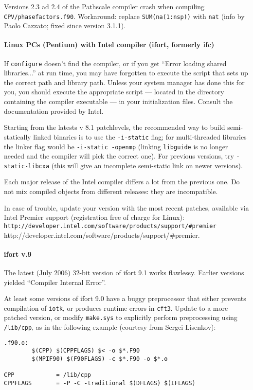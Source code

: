 \documentclass[12pt,a4paper]{article}
\begin{document}
Versions 2.3 ad 2.4 of the Pathscale compiler crash when compiling
\texttt{CPV/phasefactors.f90}. Workaround: replace \texttt{SUM(na(1:nsp))}
with \texttt{nat} (info by Paolo Cazzato; fixed since version 3.1.1).

\paragraph{Linux PCs (Pentium) with Intel compiler (ifort, formerly
ifc)}

\hfill\break
If \texttt{configure} doesn't find the compiler, or if you get ``Error
loading shared libraries...'' at run time, you may have forgotten to
execute the script that sets up the correct path and library path.
Unless your system manager has done this for you, you should execute
the appropriate script --- located in the directory containing the
compiler executable --- in your initialization files.
Consult the documentation provided by Intel. 

Starting from the latests v 8.1 patchlevels, the recommended way to
build semi-statically linked binaries is to use the \texttt{-i-static}
flag; for multi-threaded libraries the linker flag would be
\texttt{-i-static -openmp} (linking \texttt{libguide} is no longer 
needed and the compiler will pick the correct one). For previous 
versions, try \texttt{-static-libcxa} (this will
give an incomplete semi-static link on newer versions).

Each major release of the Intel compiler differs a lot from
the previous one. Do not mix compiled objects from different releases: 
they are incompatible. 

In case of trouble, update your version with the most recent
patches, available via Intel Premier support (registration free 
of charge for Linux): 
\htmladdnormallink%
{\texttt{http://developer.intel.com/software/products/support/\#premier}}%
{http://developer.intel.com/software/products/support/\#premier}.

\paragraph{ifort v.9}

The latest (July 2006) 32-bit version of ifort 9.1 works flawlessy.
Earlier versions yielded ``Compiler Internal Error''.

At least some versions of ifort 9.0 have a buggy preprocessor that 
either prevents compilation of \texttt{iotk}, or produces runtime 
errors in \texttt{cft3}. Update to a more patched version, or
modify \texttt{make.sys} to explicitly perform preprocessing 
using \texttt{/lib/cpp}, as in the following example (courtesy 
from Sergei Lisenkov):
\begin{verbatim}
.f90.o:
        $(CPP) $(CPPFLAGS) $< -o $*.F90
        $(MPIF90) $(F90FLAGS) -c $*.F90 -o $*.o

CPP            = /lib/cpp
CPPFLAGS       = -P -C -traditional $(DFLAGS) $(IFLAGS)
\end{verbatim}
\end{document}
